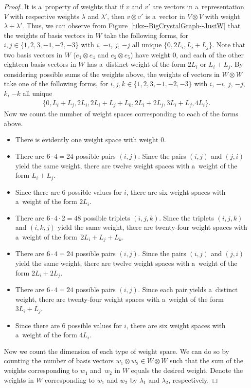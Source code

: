 \documentclass[pdftex]{sigma}
\numberwithin{equation}{section}
\theoremstyle{definition}
\begin{document}
\begin{proof}
 It is a~property of weights that if $v$ and $v'$ are vectors in a~representation $V$ with respective weights $\lambda$ and $\lambda'$, then $v \otimes v'$ is a~vector in $V \otimes V$ with weight $\lambda + \lambda'$. Thus, we can observe from Figure~\ref{tikz--BigCrystalGraph--JustW} that the weights of basis vectors in $W$ take the following forms, for~${i,j \in \{1,2,3,-1,-2,-3\}}$ with $i$, $-i$, $j$, $-j$ all unique $
 \{0,2L_i,L_i+L_j\}$.
 Note that two basis vectors in $W$ ($e_1 \otimes e_4$ and $e_2 \otimes e_5$) have weight $0$, and each of the other eighteen basis vectors in $W$ has a~distinct weight of the form $2L_i$ or $L_i+L_j$. By considering possible sums of the weights above, the weights of vectors in $W \otimes W$ take one of the following forms, for $i,j,k \in \{1,2,3,-1,-2,-3\}$ with $i$, $-i$, $j$, $-j$, $k$, $-k$ all unique
 \begin{align*}
 \{0,L_i + L_j,2L_i,2L_i + L_j + L_k,2L_i + 2L_j,3L_i + L_j,4L_i\}.
 \end{align*}
 Now we count the number of weight spaces corresponding to each of the forms above.
 \begin{itemize}\itemsep=0pt
 \item There is evidently one weight space with weight $0$.
 \item There are $6 \cdot 4 = 24$ possible pairs $(i,j)$. Since the pairs $(i,j)$ and $(j,i)$ yield the same weight, there are twelve weight spaces with a~weight of the form $L_i + L_j$.
 \item Since there are $6$ possible values for $i$, there are six weight spaces with a~weight of the form $2L_i$.
 \item There are $6 \cdot 4 \cdot 2 = 48$ possible triplets $(i,j,k)$. Since the triplets $(i,j,k)$ and $(i,k,j)$ yield the same weight, there are twenty-four weight spaces with a~weight of the form~${2L_i + L_j + L_k}$.
 \item There are $6 \cdot 4 = 24$ possible pairs $(i,j)$. Since the pairs $(i,j)$ and $(j,i)$ yield the same weight, there are twelve weight spaces with a~weight of the form $2L_i + 2L_j$.
 \item There are $6 \cdot 4 = 24$ possible pairs $(i,j)$. Since each pair yields a~distinct weight, there are twenty-four weight spaces with a~weight of the form $3L_i + L_j$.
 \item Since there are $6$ possible values for $i$, there are six weight spaces with a~weight of the form $4L_i$.
 \end{itemize}
 Now we count the dimension of each type of weight space. We can do so by counting the number of basis vectors $w_1 \otimes w_2 \in W \otimes W$ such that the sum of the weights corresponding to $w_1$ and~$w_2$ in $W$ equals the desired weight. Denote the weights in $W$ corresponding to $w_1$ and $w_2$ by $\lambda_1$ and $\lambda_2$, respectively.

\end{proof}
\end{document}
